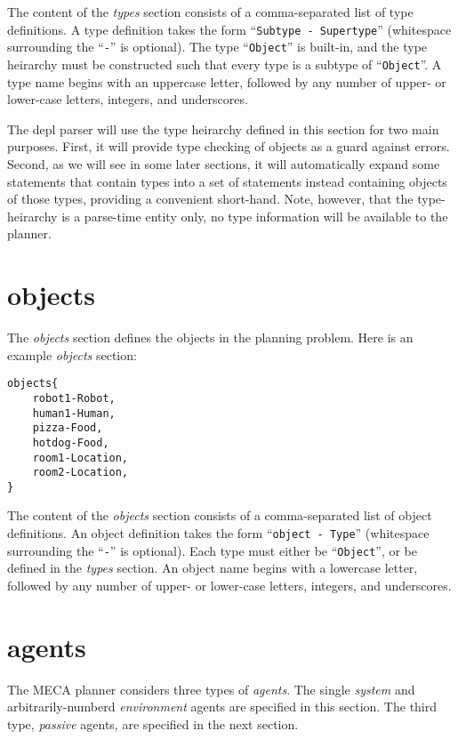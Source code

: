 \documentclass{article}
\begin{document}
The content of the \emph{types} section consists of a comma-separated list of
type definitions. A type definition takes the form
``\texttt{Subtype - Supertype}'' (whitespace surrounding the ``\texttt{-}'' is
optional). The type ``\texttt{Object}'' is built-in, and
the type heirarchy must be constructed such that every type is a subtype of
``\texttt{Object}''.  A type name begins with an uppercase letter, followed
by any number of upper- or lower-case letters, integers, and underscores.

The depl parser will use the type heirarchy defined in this section for two main
purposes. First, it will provide type checking of objects as a guard against errors.
Second, as we will see in some later sections, it will automatically expand some
statements that contain types into a set of statements instead containing
objects of those types, providing a convenient short-hand. Note, however, that
the type-heirarchy is a parse-time entity only, no type information will be
available to the planner.


\section{objects}

The \emph{objects} section defines the objects in the planning problem.
Here is an example \emph{objects} section:
\begin{verbatim}
objects{
    robot1-Robot,
    human1-Human,
    pizza-Food,
    hotdog-Food,
    room1-Location,
    room2-Location,
}
\end{verbatim}

The content of the \emph{objects} section consists of a comma-separated list of
object definitions. An object definition takes the form ``\texttt{object -
Type}'' (whitespace surrounding the ``\texttt{-}'' is optional). Each type must
either be ``\texttt{Object}'', or be defined in the \emph{types} section.  An
object name begins with a lowercase letter, followed by any number of upper-
or lower-case letters, integers, and underscores.



\section{agents}

The MECA planner considers three types of \emph{agents}. The single
\emph{system} and arbitrarily-numberd \emph{environment} agents are specified in
this section.  The third type, \emph{passive} agents, are specified in the next
section.
\end{document}
